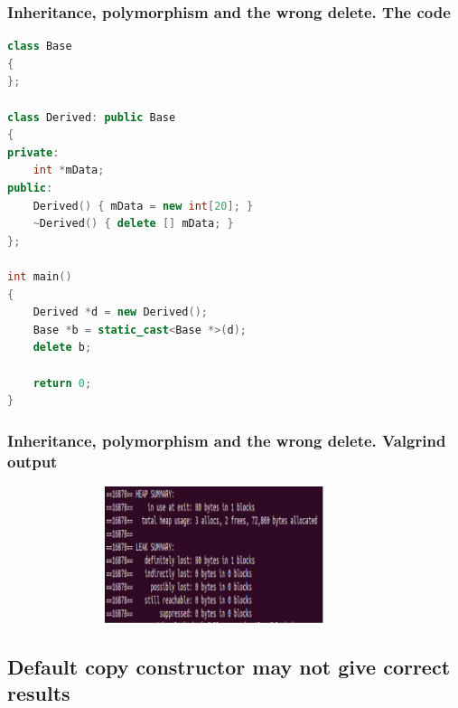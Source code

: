 \documentclass{bredelebeamer}
\begin{document}
\begin{frame}[fragile]
\frametitle{Inheritance, polymorphism and the wrong delete. The code} 
	\begin{center}
		\begin{lstlisting}[language=C++]
class Base
{
};

class Derived: public Base
{
private:
	int *mData;
public:
	Derived() { mData = new int[20]; }
	~Derived() { delete [] mData; }
};

int main()
{
	Derived *d = new Derived();
	Base *b = static_cast<Base *>(d);
	delete b;

	return 0;
}
		\end{lstlisting}
	\end{center}
\end{frame}

\begin{frame}[fragile]
	\frametitle{Inheritance, polymorphism and the wrong delete. Valgrind output}
	\begin{center}
		\begin{figure}
			\includegraphics[height=4cm,width=10cm]{virtual_destructor.png}
		\end{figure}
	\end{center}
\end{frame}


\subsection{Default copy constructor may not give correct results}
\end{document}
